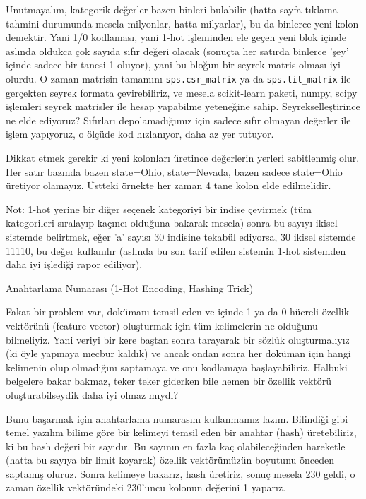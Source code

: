 \documentclass[12pt,fleqn]{article}\usepackage{../../common}
\begin{document}
Unutmayalım, kategorik değerler bazen binleri bulabilir (hatta sayfa
tıklama tahmini durumunda mesela milyonlar, hatta milyarlar), bu da
binlerce yeni kolon demektir. Yani 1/0 kodlaması, yani 1-hot işleminden ele
geçen yeni blok içinde aslında oldukca çok sayıda sıfır değeri olacak
(sonuçta her satırda binlerce 'şey' içinde sadece bir tanesi 1 oluyor),
yani bu bloğun bir seyrek matris olması iyi olurdu. O zaman matrisin
tamamını \verb!sps.csr_matrix! ya da \verb!sps.lil_matrix! ile gerçekten
seyrek formata çevirebiliriz, ve mesela scikit-learn paketi, numpy, scipy
işlemleri seyrek matrisler ile hesap yapabilme yeteneğine
sahip. Seyrekselleştirince ne elde ediyoruz?  Sıfırları depolamadığımız
için sadece sıfır olmayan değerler ile işlem yapıyoruz, o ölçüde kod
hızlanıyor, daha az yer tutuyor.

Dikkat etmek gerekir ki yeni kolonları üretince değerlerin yerleri
sabitlenmiş olur. Her satır bazında bazen state=Ohio, state=Nevada, bazen
sadece state=Ohio üretiyor olamayız. Üstteki örnekte her zaman 4 tane kolon
elde edilmelidir.

Not: 1-hot yerine bir diğer seçenek kategoriyi bir indise çevirmek (tüm
kategorileri sıralayıp kaçıncı olduğuna bakarak mesela) sonra bu sayıyı
ikisel sistemde belirtmek, eğer 'a' sayısı 30 indisine tekabül ediyorsa, 30
ikisel sistemde 11110, bu değer kullanılır (aslında bu son tarif edilen
sistemin 1-hot sistemden daha iyi işlediği rapor ediliyor).

Anahtarlama Numarası (1-Hot Encoding, Hashing Trick)

Fakat bir problem var, dokümanı temsil eden ve içinde 1 ya da
0 hücreli özellik vektörünü (feature vector) oluşturmak için tüm
kelimelerin ne olduğunu bilmeliyiz. Yani veriyi bir kere baştan sonra
tarayarak bir sözlük oluşturmalıyız (ki öyle yapmaya mecbur kaldık) ve
ancak ondan sonra her doküman için hangi kelimenin olup olmadığını
saptamaya ve onu kodlamaya başlayabiliriz. Halbuki belgelere bakar
bakmaz, teker teker giderken bile hemen bir özellik vektörü
oluşturabilseydik daha iyi olmaz mıydı?

Bunu başarmak için anahtarlama numarasını kullanmamız lazım. Bilindiği gibi
temel yazılım bilime göre bir kelimeyi temsil eden bir anahtar (hash)
üretebiliriz, ki bu hash değeri bir sayıdır. Bu sayının en fazla kaç
olabileceğinden hareketle (hatta bu sayıya bir limit koyarak) özellik
vektörümüzün boyutunu önceden saptamış oluruz.  Sonra kelimeye bakarız,
hash üretiriz, sonuç mesela 230 geldi, o zaman özellik vektöründeki
230'uncu kolonun değerini 1 yaparız.
\end{document}
